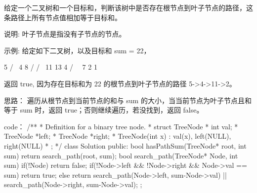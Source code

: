 给定一个二叉树和一个目标和，判断该树中是否存在根节点到叶子节点的路径，这条路径上所有节点值相加等于目标和。

说明: 叶子节点是指没有子节点的节点。

示例: 
给定如下二叉树，以及目标和 sum = 22，

              5
             / \
            4   8
           /   / \
          11  13  4
         /  \      \
        7    2      1

返回 true, 因为存在目标和为 22 的根节点到叶子节点的路径 5->4->11->2。

























思路：
遍历从根节点到当前节点的和与 sum 的大小，当当前节点为叶子节点且和等于 sum 时，返回 true；否则继续遍历，若没找到，返回 false。


























code：
/**
 * Definition for a binary tree node.
 * struct TreeNode {
 *     int val;
 *     TreeNode *left;
 *     TreeNode *right;
 *     TreeNode(int x) : val(x), left(NULL), right(NULL) {}
 * };
 */
class Solution {
public:
    bool hasPathSum(TreeNode* root, int sum) {
        return search_path(root, sum);
    }
    bool search_path(TreeNode* Node, int sum)
    {
        if(!Node) return false;
        if(!Node->left && !Node->right && Node->val == sum) return true;
        else return search_path(Node->left, sum-Node->val) || search_path(Node->right, sum-Node->val);
    }
};